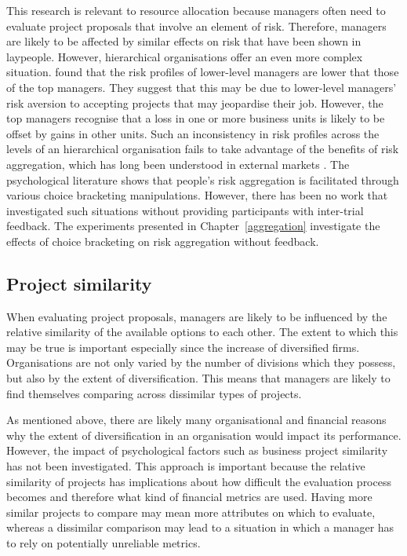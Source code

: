 \documentclass[a4paper, nobind, dvipsnames]{templates/ociamthesis}
\theoremstyle{definition}
\theoremstyle{definition}
\theoremstyle{definition}
\theoremstyle{definition}
\theoremstyle{remark}
\begin{document}
This research is relevant to resource allocation because managers often need to
evaluate project proposals that involve an element of risk. Therefore, managers
are likely to be affected by similar effects on risk that have been shown in
laypeople. However, hierarchical organisations offer an even more complex
situation. \textcite{lovallo2020} found that the risk profiles of lower-level managers are
lower that those of the top managers. They suggest that this may be due to
lower-level managers' risk aversion to accepting projects that may jeopardise
their job. However, the top managers recognise that a loss in one or more
business units is likely to be offset by gains in other units. Such an
inconsistency in risk profiles across the levels of an hierarchical organisation
fails to take advantage of the benefits of risk aggregation, which has long been
understood in external markets \autocite{markowitz1952}. The psychological literature
shows that people's risk aggregation is facilitated through various choice
bracketing manipulations. However, there has been no work that investigated such
situations without providing participants with inter-trial feedback. The
experiments presented in Chapter~\ref{aggregation} investigate the effects of
choice bracketing on risk aggregation without feedback.

\subsection{Project similarity}

When evaluating project proposals, managers are likely to be influenced by the
relative similarity of the available options to each other. The extent to which
this may be true is important especially since the increase of diversified
firms. Organisations are not only varied by the number of divisions which they
possess, but also by the extent of diversification. This means that managers are
likely to find themselves comparing across dissimilar types of projects.

As mentioned above, there are likely many organisational and financial reasons
why the extent of diversification in an organisation would impact its
performance. However, the impact of psychological factors such as business
project similarity has not been investigated. This approach is important because
the relative similarity of projects has implications about how difficult the
evaluation process becomes and therefore what kind of financial metrics are
used. Having more similar projects to compare may mean more attributes on which
to evaluate, whereas a dissimilar comparison may lead to a situation in which a
manager has to rely on potentially unreliable metrics.
\end{document}
